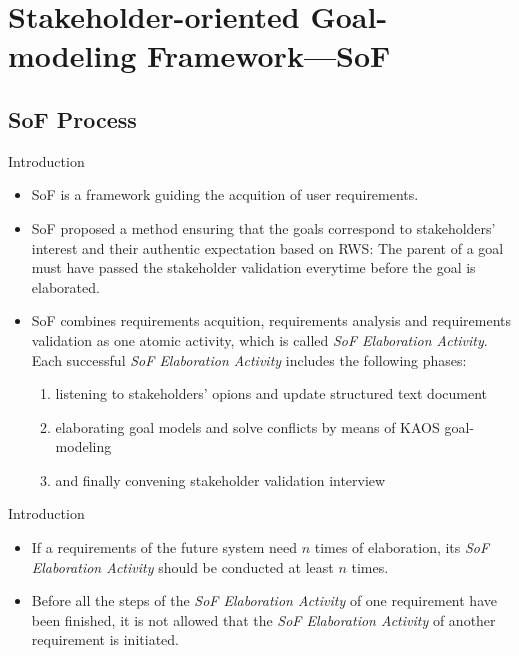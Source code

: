 ﻿\documentclass{beamer}
\begin{document}
\section{Stakeholder-oriented Goal-modeling Framework—SoF}
\subsection{SoF Process}%
\begin{frame}   {Introduction}         %
  \small{
    \begin{itemize}
    \item SoF is a framework guiding the acquition of user requirements. \pause
    \item SoF proposed a method ensuring that the goals correspond to stakeholders' interest and their authentic expectation based on RWS: The parent of a goal must have passed the stakeholder validation everytime before the goal is elaborated. \pause
    \item SoF combines requirements acquition, requirements analysis and requirements validation as one atomic activity, which is called \emph{SoF Elaboration Activity}. Each successful \emph{SoF Elaboration Activity} includes the following phases:
      \begin{enumerate}
      \item listening to stakeholders' opions and update structured text document
      \item elaborating goal models and solve conflicts by means of KAOS goal-modeling
      \item and finally convening stakeholder validation interview
      \end{enumerate}
    \end{itemize}
  }
\end{frame}
\begin{frame}  {Introduction}        %
  \begin{itemize}
  \item If a requirements of the future system need $n$ times of elaboration, its \emph{SoF Elaboration Activity} should be conducted at least $n$ times.\pause
  \item Before all the steps of the \emph{SoF Elaboration Activity} of one requirement have been finished, it is not allowed that the \emph{SoF Elaboration Activity} of another requirement is initiated. \pause
  \end{itemize}
\end{frame}
\end{document}
